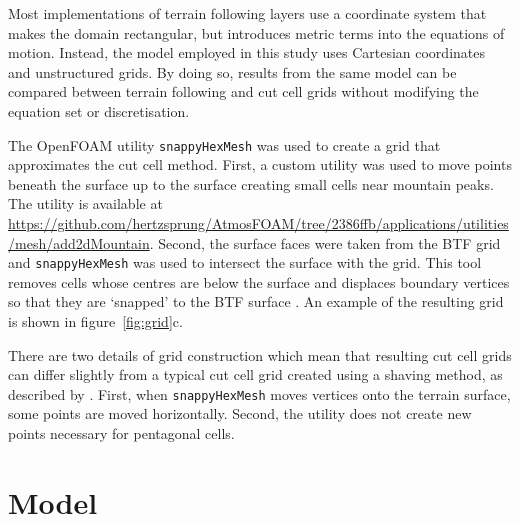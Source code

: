 \documentclass[twocol]{ametsoc}
\begin{document}
Most implementations of terrain following layers use a coordinate system that makes the domain rectangular, but introduces metric terms into the equations of motion.  Instead, the model employed in this study uses Cartesian coordinates and unstructured grids.  By doing so, results from the same model can be compared between terrain following and cut cell grids without modifying the equation set or discretisation.

The OpenFOAM utility \texttt{snappyHexMesh} was used to create a grid that approximates the cut cell method.  First, a custom utility was used to move points beneath the surface up to the surface creating small cells near mountain peaks.  The utility is available at \url{https://github.com/hertzsprung/AtmosFOAM/tree/2386ffb/applications/utilities/mesh/add2dMountain}.   Second, the surface faces were taken from the BTF grid and \texttt{snappyHexMesh} was used to intersect the surface with the grid.  This tool removes cells whose centres are below the surface and displaces boundary vertices so that they are `snapped' to the BTF surface \citep{openfoam2015}.  An example of the resulting grid is shown in figure~\ref{fig:grid}c.

There are two details of grid construction which mean that resulting cut cell grids can differ slightly from a typical cut cell grid created using a shaving method, as described by \citet{adcroft1997}.  First, when \texttt{snappyHexMesh} moves vertices onto the terrain surface, some points are moved horizontally.  Second, the utility does not create new points necessary for pentagonal cells.


\section{Model}
\label{sec:model}
\end{document}
